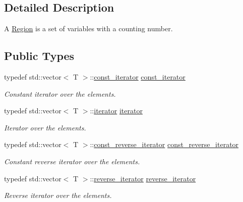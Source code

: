 \subsection{Detailed Description}
A \hyperlink{classdai_1_1Region}{Region} is a set of variables with a counting number. \subsection*{Public Types}
\begin{CompactItemize}
\item 
\hypertarget{classdai_1_1smallSet_103c819872818d14a7234a1f618a815c}{
typedef std::vector$<$ T $>$::\hyperlink{classdai_1_1smallSet_103c819872818d14a7234a1f618a815c}{const\_\-iterator} \hyperlink{classdai_1_1smallSet_103c819872818d14a7234a1f618a815c}{const\_\-iterator}}
\label{classdai_1_1smallSet_103c819872818d14a7234a1f618a815c}

\begin{CompactList}\small\item\em Constant iterator over the elements. \item\end{CompactList}\item 
\hypertarget{classdai_1_1smallSet_254dd4f8cad9c7bce5522e9dbcfc4f49}{
typedef std::vector$<$ T $>$::\hyperlink{classdai_1_1smallSet_254dd4f8cad9c7bce5522e9dbcfc4f49}{iterator} \hyperlink{classdai_1_1smallSet_254dd4f8cad9c7bce5522e9dbcfc4f49}{iterator}}
\label{classdai_1_1smallSet_254dd4f8cad9c7bce5522e9dbcfc4f49}

\begin{CompactList}\small\item\em Iterator over the elements. \item\end{CompactList}\item 
\hypertarget{classdai_1_1smallSet_46882a9010267d41f447feb6aaf65cc1}{
typedef std::vector$<$ T $>$::\hyperlink{classdai_1_1smallSet_46882a9010267d41f447feb6aaf65cc1}{const\_\-reverse\_\-iterator} \hyperlink{classdai_1_1smallSet_46882a9010267d41f447feb6aaf65cc1}{const\_\-reverse\_\-iterator}}
\label{classdai_1_1smallSet_46882a9010267d41f447feb6aaf65cc1}

\begin{CompactList}\small\item\em Constant reverse iterator over the elements. \item\end{CompactList}\item 
\hypertarget{classdai_1_1smallSet_6dea3ee0aa40c4312e6278a7d17f516d}{
typedef std::vector$<$ T $>$::\hyperlink{classdai_1_1smallSet_6dea3ee0aa40c4312e6278a7d17f516d}{reverse\_\-iterator} \hyperlink{classdai_1_1smallSet_6dea3ee0aa40c4312e6278a7d17f516d}{reverse\_\-iterator}}
\label{classdai_1_1smallSet_6dea3ee0aa40c4312e6278a7d17f516d}

\begin{CompactList}\small\item\em Reverse iterator over the elements. \item\end{CompactList}\end{CompactItemize}
